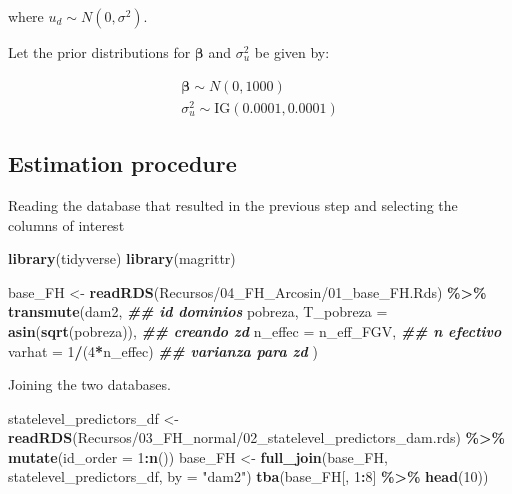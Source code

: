 \documentclass[
  12pt,
]{book}
\newenvironment{Shaded}{\begin{snugshade}}{\end{snugshade}}
\newcommand{\AttributeTok}[1]{\textcolor[rgb]{0.13,0.29,0.53}{#1}}
\newcommand{\DecValTok}[1]{\textcolor[rgb]{0.00,0.00,0.81}{#1}}
\newcommand{\DocumentationTok}[1]{\textcolor[rgb]{0.56,0.35,0.01}{\textbf{\textit{#1}}}}
\newcommand{\FunctionTok}[1]{\textcolor[rgb]{0.13,0.29,0.53}{\textbf{#1}}}
\newcommand{\NormalTok}[1]{#1}
\newcommand{\OtherTok}[1]{\textcolor[rgb]{0.56,0.35,0.01}{#1}}
\newcommand{\SpecialCharTok}[1]{\textcolor[rgb]{0.81,0.36,0.00}{\textbf{#1}}}
\newcommand{\StringTok}[1]{\textcolor[rgb]{0.31,0.60,0.02}{#1}}
\begin{document}
where \(u_d \sim N(0 , \sigma^2)\).

Let the prior distributions for \(\boldsymbol{\beta}\) and \(\sigma_{u}^{2}\) be given by:

\begin{align*}
\boldsymbol{\beta}  \sim    N\left(0,1000 \right)\\
\sigma_{u}^{2}  \sim    \text{IG}\left(0.0001,0.0001\right)
\end{align*}

\hypertarget{estimation-procedure-1}{%
\subsection{Estimation procedure}\label{estimation-procedure-1}}

Reading the database that resulted in the previous step and selecting the columns of interest

\begin{Shaded}
\begin{Highlighting}[]
\FunctionTok{library}\NormalTok{(tidyverse)}
\FunctionTok{library}\NormalTok{(magrittr)}

\NormalTok{base\_FH }\OtherTok{\textless{}{-}} \FunctionTok{readRDS}\NormalTok{(}\StringTok{\textquotesingle{}Recursos/04\_FH\_Arcosin/01\_base\_FH.Rds\textquotesingle{}}\NormalTok{) }\SpecialCharTok{\%\textgreater{}\%} 
\FunctionTok{transmute}\NormalTok{(dam2,                            }\DocumentationTok{\#\# id dominios}
\NormalTok{          pobreza,}
          \AttributeTok{T\_pobreza =} \FunctionTok{asin}\NormalTok{(}\FunctionTok{sqrt}\NormalTok{(pobreza)),  }\DocumentationTok{\#\# creando zd}
          \AttributeTok{n\_effec =}\NormalTok{ n\_eff\_FGV,              }\DocumentationTok{\#\# n efectivo}
          \AttributeTok{varhat =} \DecValTok{1}\SpecialCharTok{/}\NormalTok{(}\DecValTok{4}\SpecialCharTok{*}\NormalTok{n\_effec)            }\DocumentationTok{\#\# varianza para zd}
\NormalTok{)}
\end{Highlighting}
\end{Shaded}

Joining the two databases.

\begin{Shaded}
\begin{Highlighting}[]
\NormalTok{statelevel\_predictors\_df }\OtherTok{\textless{}{-}}
  \FunctionTok{readRDS}\NormalTok{(}\StringTok{\textquotesingle{}Recursos/03\_FH\_normal/02\_statelevel\_predictors\_dam.rds\textquotesingle{}}\NormalTok{) }\SpecialCharTok{\%\textgreater{}\%}
  \FunctionTok{mutate}\NormalTok{(}\AttributeTok{id\_order =} \DecValTok{1}\SpecialCharTok{:}\FunctionTok{n}\NormalTok{())}
\NormalTok{base\_FH }\OtherTok{\textless{}{-}}
  \FunctionTok{full\_join}\NormalTok{(base\_FH, statelevel\_predictors\_df, }\AttributeTok{by =} \StringTok{"dam2"}\NormalTok{)}
\FunctionTok{tba}\NormalTok{(base\_FH[, }\DecValTok{1}\SpecialCharTok{:}\DecValTok{8}\NormalTok{] }\SpecialCharTok{\%\textgreater{}\%} \FunctionTok{head}\NormalTok{(}\DecValTok{10}\NormalTok{))}
\end{Highlighting}
\end{Shaded}
\end{document}
